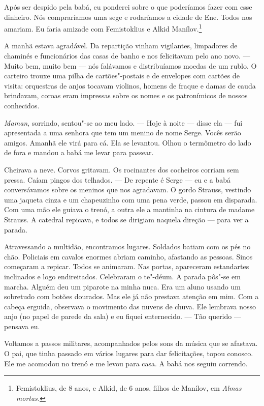 Após ser despido pela babá, eu ponderei sobre o que poderíamos fazer com
esse dinheiro. Nós compraríamos uma sege e rodaríamos a cidade de Ene.
Todos nos amariam. Eu faria amizade com Femistoklius e Alkid
Manílov.\footnote{Femistoklius, de 8 anos, e Alkid, de 6 anos, filhos de
  Manílov, em \emph{Almas mortas. }}

A manhã estava agradável. Da repartição vinham vigilantes, limpadores de
chaminés e funcionários das casas de banho e nos felicitavam pelo ano
novo. --- Muito bem, muito bem --- nós falávamos e distribuíamos moedas
de um rublo. O carteiro trouxe uma pilha de cartões"-postais e de
envelopes com cartões de visita: orquestras de anjos tocavam violinos,
homens de fraque e damas de cauda brindavam, coroas eram impressas sobre
os nomes e os patronímicos de nossos conhecidos.

\emph{Maman}, sorrindo, sentou"-se ao meu lado. --- Hoje à noite ---
disse ela --- fui apresentada a uma senhora que tem um menino de nome
Serge. Vocês serão amigos. Amanhã ele virá para cá. Ela se levantou.
Olhou o termômetro do lado de fora e mandou a babá me levar para
passear.

Cheirava a neve. Corvos gritavam. Os rocinantes dos cocheiros corriam
sem pressa. Caíam pingos dos telhados. --- De repente é Serge --- eu e a
babá conversávamos sobre os meninos que nos agradavam. O gordo Strauss,
vestindo uma jaqueta cinza e um chapeuzinho com uma pena verde, passou
em disparada. Com uma mão ele guiava o trenó, a outra ele a mantinha na
cintura de madame Strauss. A catedral repicava, e todos se dirigiam
naquela direção --- para ver a parada.

Atravessando a multidão, encontramos lugares. Soldados batiam com os pés
no chão. Policiais em cavalos enormes abriam caminho, afastando as
pessoas. Sinos começaram a repicar. Todos se animaram. Nas portas,
apareceram estandartes inclinados e logo endireitados. Celebraram o
te"-déum. A parada pôs"-se em marcha. Alguém deu um piparote na minha
nuca. Era um aluno usando um sobretudo com botões dourados. Mas ele já
não prestava atenção em mim. Com a cabeça erguida, observava o movimento
das nuvens de chuva. Ele lembrava nosso anjo (no papel de parede da
sala) e eu fiquei enternecido. --- Tão querido --- pensava eu.

Voltamos a passos militares, acompanhados pelos sons da música que se
afastava. O pai, que tinha passado em vários lugares para dar
felicitações, topou conosco. Ele me acomodou no trenó e me levou para
casa. A babá nos seguiu correndo.

